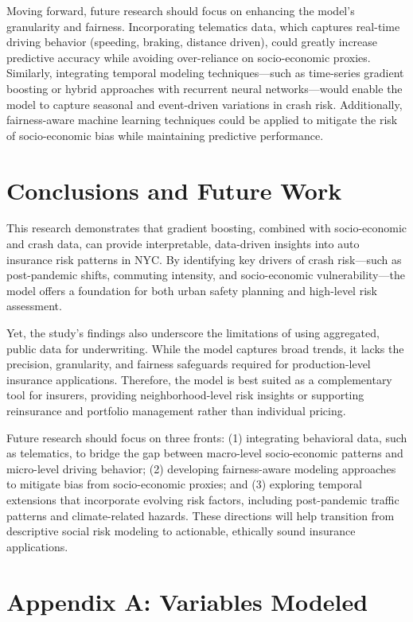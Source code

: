 \documentclass[
  number,
  review,
  3p]{elsarticle}
\begin{document}
Moving forward, future research should focus on enhancing the model's
granularity and fairness. Incorporating telematics data, which captures
real-time driving behavior (speeding, braking, distance driven), could
greatly increase predictive accuracy while avoiding over-reliance on
socio-economic proxies. Similarly, integrating temporal modeling
techniques---such as time-series gradient boosting or hybrid approaches
with recurrent neural networks---would enable the model to capture
seasonal and event-driven variations in crash risk. Additionally,
fairness-aware machine learning techniques could be applied to mitigate
the risk of socio-economic bias while maintaining predictive
performance.

\section{Conclusions and Future Work}\label{conclusions-and-future-work}

This research demonstrates that gradient boosting, combined with
socio-economic and crash data, can provide interpretable, data-driven
insights into auto insurance risk patterns in NYC. By identifying key
drivers of crash risk---such as post-pandemic shifts, commuting
intensity, and socio-economic vulnerability---the model offers a
foundation for both urban safety planning and high-level risk
assessment.

Yet, the study's findings also underscore the limitations of using
aggregated, public data for underwriting. While the model captures broad
trends, it lacks the precision, granularity, and fairness safeguards
required for production-level insurance applications. Therefore, the
model is best suited as a complementary tool for insurers, providing
neighborhood-level risk insights or supporting reinsurance and portfolio
management rather than individual pricing.

Future research should focus on three fronts: (1) integrating behavioral
data, such as telematics, to bridge the gap between macro-level
socio-economic patterns and micro-level driving behavior; (2) developing
fairness-aware modeling approaches to mitigate bias from socio-economic
proxies; and (3) exploring temporal extensions that incorporate evolving
risk factors, including post-pandemic traffic patterns and
climate-related hazards. These directions will help transition from
descriptive social risk modeling to actionable, ethically sound
insurance applications.

\section{Appendix A: Variables
Modeled}\label{appendix-a-variables-modeled}
\end{document}
